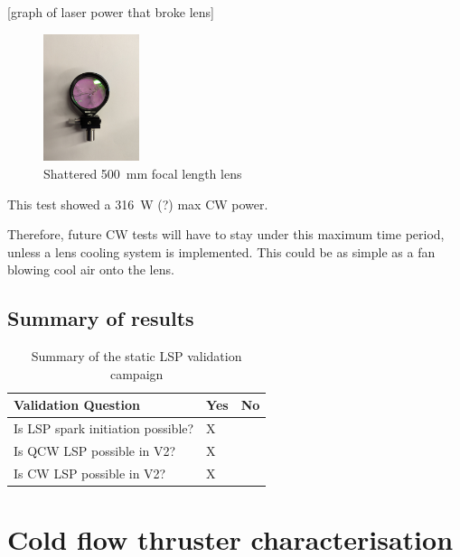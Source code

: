             [graph of laser power that broke lens]
    
            \begin{figure}[!ht]
                \centering
                \includegraphics[width=0.25\textwidth]{assets/4 experiments/Shattered 500 mm lens.jpg}
                \caption{Shattered \qty{500}{mm} focal length lens}
            \end{figure}
    
            This test showed a \qty{316}{W} (?) max CW power.
    
            Therefore, future CW tests will have to stay under this maximum time period, unless a lens cooling system is implemented. This could be as simple as a fan blowing cool air onto the lens.

        \subsection{Summary of results}

            \begin{table}[!ht]
                \centering
                \caption{Summary of the static LSP validation campaign}
                \label{tab:validation}
                \begin{tabular}{@{}lll@{}}
                \toprule
                Validation Question               & Yes & No \\ \midrule
                Is LSP spark initiation possible? & X   &    \\
                Is QCW LSP possible in V2?        & X   &    \\
                Is CW LSP possible in V2?         & X   &   
                \end{tabular}
            \end{table}


    \section{Cold flow thruster characterisation}

